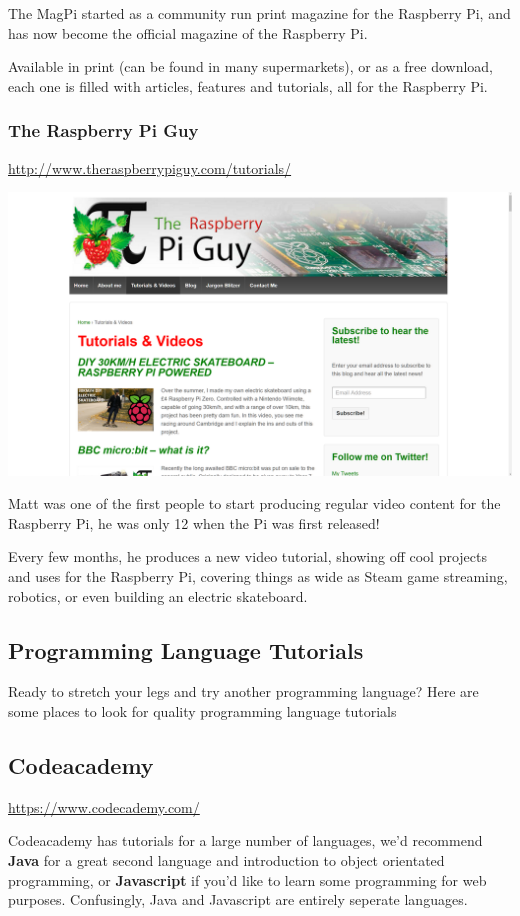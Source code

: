 			The MagPi started as a community run print magazine for the Raspberry Pi, and has now become the official magazine of the Raspberry Pi.
			
			Available in print (can be found in many supermarkets), or as a free download, each one is filled with articles, features and tutorials, all for the Raspberry Pi.
			
		\subsubsection*{The Raspberry Pi Guy}
			
			\url{http://www.theraspberrypiguy.com/tutorials/}
			\begin{center}
				\includegraphics[width=0.5\linewidth]{McrRaspJam/000_IntroToPi/4_Resources/piguy}
			\end{center}	
			
			Matt was one of the first people to start producing regular video content for the Raspberry Pi, he was only 12 when the Pi was first released!
			
			Every few months, he produces a new video tutorial, showing off cool projects and uses for the Raspberry Pi, covering things as wide as Steam game streaming, robotics, or even building an electric skateboard.
		
	\subsection{Programming Language Tutorials}
	
		Ready to stretch your legs and try another programming language? Here are some places to look for quality programming language tutorials
		
		\subsection*{Codeacademy}
		
		\url{https://www.codecademy.com/}
		
		Codeacademy has tutorials for a large number of languages, we'd recommend \textbf{Java} for a great second language and introduction to object orientated programming, or \textbf{Javascript} if you'd like to learn some programming for web purposes. Confusingly, Java and Javascript are entirely seperate languages.
		
